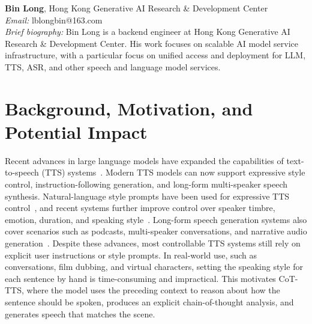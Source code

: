 \documentclass[a4paper]{article}
\begin{document}
\noindent\textbf{Bin Long}, Hong Kong Generative AI Research \& Development Center\\
\textit{Email:} lblongbin@163.com\\
\textit{Brief biography:} Bin Long is a backend engineer at Hong Kong Generative AI Research \& Development Center. His work focuses on scalable AI model service infrastructure, with a particular focus on unified access and deployment for LLM, TTS, ASR, and other speech and language model services.


\section{Background, Motivation, and Potential Impact}

Recent advances in large language models have expanded the capabilities of text-to-speech (TTS) systems~\cite{xie2025towards}. Modern TTS models can now support expressive style control, instruction-following generation, and long-form multi-speaker speech synthesis. Natural-language style prompts have been used for expressive TTS control~\cite{yang2024instructtts}, and recent systems further improve control over speaker timbre, emotion, duration, and speaking style~\cite{liao2026fish,zhou2025voxcpm,zhou2026indextts2}. Long-form speech generation systems also cover scenarios such as podcasts, multi-speaker conversations, and narrative audio generation~\cite{song2026borderless,xie2025soulx}. Despite these advances, most controllable TTS systems still rely on explicit user instructions or style prompts. In real-world use, such as conversations, film dubbing, and virtual characters, setting the speaking style for each sentence by hand is time-consuming and impractical. This motivates CoT-TTS, where the model uses the preceding context to reason about how the sentence should be spoken, produces an explicit chain-of-thought analysis, and generates speech that matches the scene.\\
\end{document}
